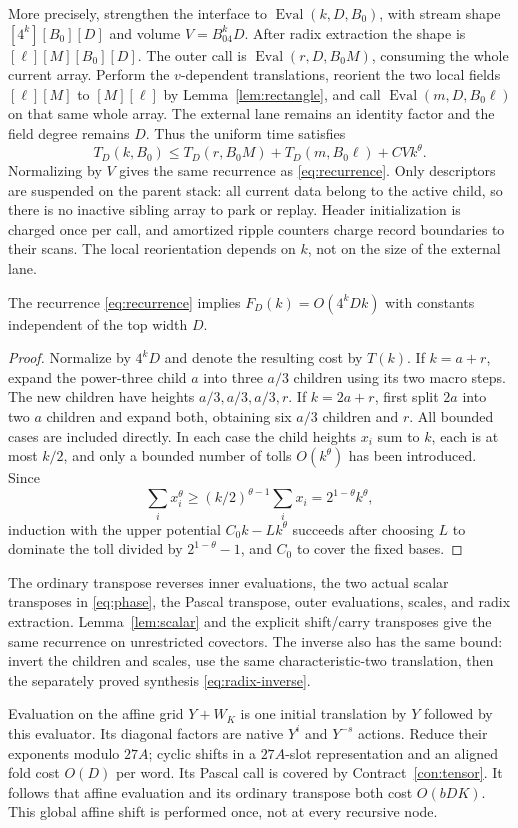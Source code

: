 More precisely, strengthen the interface to
$\operatorname{Eval}(k,D,B_0)$, with stream shape
$[4^k][B_0][D]$ and volume $V=B_04^kD$. After radix extraction the
shape is $[\ell][M][B_0][D]$. The outer call is
$\operatorname{Eval}(r,D,B_0M)$, consuming the whole current array.
Perform the $v$-dependent translations, reorient the two local fields
$[\ell][M]$ to $[M][\ell]$ by Lemma~\ref{lem:rectangle}, and call
$\operatorname{Eval}(m,D,B_0\ell)$ on that same whole array. The
external lane remains an identity factor and the field degree remains
$D$. Thus the uniform time satisfies
\[
 T_D(k,B_0)\le T_D(r,B_0M)+T_D(m,B_0\ell)
       +CVk^\theta.
\]
Normalizing by $V$ gives the same recurrence as
\eqref{eq:recurrence}. Only descriptors are suspended on the parent
stack: all current data belong to the active child, so there is no
inactive sibling array to park or replay. Header initialization is
charged once per call, and amortized ripple counters charge record
boundaries to their scans. The local reorientation depends on $k$,
not on the size of the external lane.

\begin{lemma}\label{lem:recurrence}
The recurrence \eqref{eq:recurrence} implies
$F_D(k)=O(4^kDk)$ with constants independent of the top width $D$.
\end{lemma}
\begin{proof}
Normalize by $4^kD$ and denote the resulting cost by $T(k)$.
If $k=a+r$, expand the power-three child $a$ into three $a/3$
children using its two macro steps. The new children have heights
$a/3,a/3,a/3,r$. If $k=2a+r$, first split $2a$ into two $a$
children and expand both, obtaining six $a/3$ children and $r$.
All bounded cases are included directly. In each case the child
heights $x_i$ sum to $k$, each is at most $k/2$, and only a bounded
number of tolls $O(k^\theta)$ has been introduced. Since
\[
 \sum_i x_i^\theta
 \geq(k/2)^{\theta-1}\sum_i x_i
 =2^{1-\theta}k^\theta,
\]
induction with the upper potential $C_0k-Lk^\theta$ succeeds after
choosing $L$ to dominate the toll divided by
$2^{1-\theta}-1$, and $C_0$ to cover the fixed bases.
\end{proof}

The ordinary transpose reverses inner evaluations, the two actual
scalar transposes in \eqref{eq:phase}, the Pascal transpose, outer
evaluations, scales, and radix extraction. Lemma~\ref{lem:scalar}
and the explicit shift/carry transposes give the same recurrence on
unrestricted covectors. The inverse also has the same bound: invert
the children and scales, use the same characteristic-two translation,
then the separately proved synthesis \eqref{eq:radix-inverse}.

Evaluation on the affine grid $Y+W_K$ is one initial translation by
$Y$ followed by this evaluator. Its diagonal factors are native
$Y^i$ and $Y^{-s}$ actions. Reduce their exponents modulo $27A$;
cyclic shifts in a $27A$-slot representation and an aligned fold cost
$O(D)$ per word. Its Pascal call is covered by
Contract~\ref{con:tensor}. It follows that affine evaluation and its
ordinary transpose both cost $O(bDK)$. This global affine shift is
performed once, not at every recursive node.

